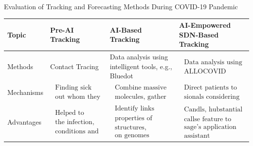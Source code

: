 \documentclass[10pt]{article}
\begin{document}
Evaluation of Tracking and Forecasting Methods During COVID-19 Pandemic

\begin{center}
\begin{tabular}{|l|l|l|l|}
\hline
Topic & Pre-AI Tracking & AI-Based Tracking & AI-Empowered SDN-Based Tracking \\
\hline
Methods & Contact Tracing & Data analysis using intelligent tools, e.g., Bluedot & $\begin{array}{l}\text { Data analysis using intelligent tools, e.g., } \\ \text { ALLOCOVID }\end{array}$ \\
\hline
Mechanisms & $\begin{array}{l}\text { Finding sick persons and figuring } \\ \text { out whom they visited recently }\end{array}$ & $\begin{array}{l}\text { Combine massive data-sets, evaluate billions of } \\ \text { molecules, gather high volume of protein structures }\end{array}$ & $\begin{array}{l}\text { Direct patients to the right medical profes- } \\ \text { sionals considering pre-existing conditions }\end{array}$ \\
\hline
Advantages & $\begin{array}{l}\text { Helped to control new cases of } \\ \text { the infection, monitored the health } \\ \text { conditions and detected symptoms }\end{array}$ & $\begin{array}{l}\text { Identify links between the genetic and biological } \\ \text { properties of diseases, Predict organisms of protein } \\ \text { structures, discover drugs for COVID-19 using data } \\ \text { on genomes }\end{array}$ & $\begin{array}{l}\text { Candls, hubstantial simultaneous phone } \\ \text { callse feature to utilize the mes- } \\ \text { sage's application Whats-app using voice- } \\ \text { assistant }\end{array}$ \\

\end{tabular}
\end{center}
\end{document}
